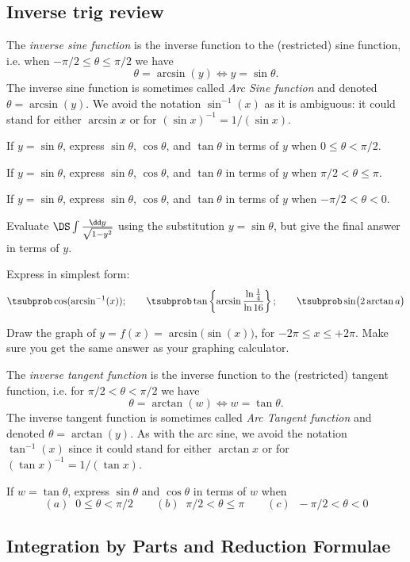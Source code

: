 \subsection{Inverse trig review}

\problem \groupproblem The \emph{inverse sine function} is the inverse
function to the (restricted) sine function, i.e. when $-\pi/2\le
\theta\le\pi/2$ we have
\[
\theta =\arcsin(y) \iff y=\sin\theta.
\]
The inverse sine function is sometimes called \emph{Arc Sine function}
and denoted $\theta=\arcsin(y)$.
We avoid the notation $\sin^{-1}(x)$ as it is ambiguous:
it could stand for either $\arcsin x$ or for $(\sin x)^{-1} = 1/(\sin x)$.


\subprob If $y=\sin\theta$, express $\sin\theta$, $\cos\theta$, and
$\tan\theta$ in terms of $y$ when \(0\le\theta<\pi/2\).

\subprob If $y=\sin\theta$, express $\sin\theta$, $\cos\theta$, and
$\tan\theta$ in terms of $y$ when $\pi/2<\theta\le\pi$.

\subprob If $y=\sin\theta$, express $\sin\theta$, $\cos\theta$, and
$\tan\theta$ in terms of $y$ when $-\pi/2<\theta<0$.

\subprob Evaluate $\DS\int\frac{\dd y}{\sqrt{1-y^2}}$ using the
substitution $y=\sin\theta$, but give the final answer in terms of
$y$.

\problem \groupproblem Express in simplest form:
\[
\tsubprob \cos(\arcsin^{-1}(x));\qquad
\tsubprob \tan \left\{ \arcsin\frac{\ln \frac14}{\ln 16}\right\};\qquad
\tsubprob \sin \bigl(2\arctan a\bigr)
\]

\problem \groupproblem  Draw the graph of $y=f(x) = \arcsin\bigl (\sin (x)\bigr)$,
for $-2\pi\leq x\leq +2\pi$. Make sure you get the same answer as your
graphing calculator.

\problem The \emph{inverse tangent function} is the inverse function to
the (restricted) tangent function, i.e. for $\pi/2< \theta<\pi/2$ we have
\[
\theta =\arctan(w) \iff w=\tan\theta.
\]
The inverse tangent function is sometimes called \emph{Arc Tangent  function}
and denoted $\theta=\arctan(y)$.
As with the arc sine, we avoid the notation $\tan^{-1}(x)$ since it
could stand for either $\arctan x$ or for $(\tan x)^{-1} = 1/(\tan x)$.

\subprob If $w=\tan\theta$, express $\sin\theta$ and
$\cos\theta$ in terms of $w$ when
\[
(a)\;\;  0\le\theta<\pi/2 \qquad
(b)\;\; \pi/2<\theta\le\pi \qquad
(c)\;\; -\pi/2<\theta<0
\]


\subsection{Integration by Parts and Reduction Formulae}


